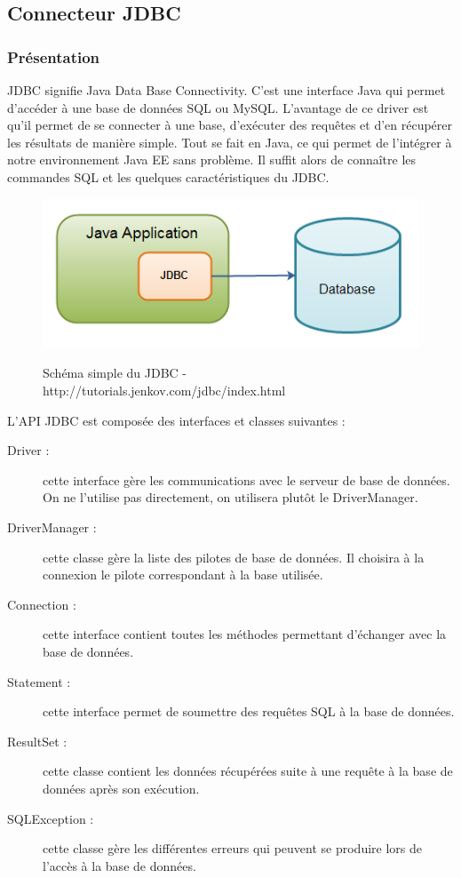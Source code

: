 \subsection{Connecteur JDBC}

\subsubsection{Présentation}
JDBC signifie Java Data Base Connectivity. C'est une interface Java qui permet d'accéder à une base de données SQL ou MySQL. L'avantage de ce driver est qu'il permet de se connecter à une base, d'exécuter des requêtes et d'en récupérer les résultats de manière simple. Tout se fait en Java, ce qui permet de l'intégrer à notre environnement Java EE sans problème. Il suffit alors de connaître les commandes SQL et les quelques caractéristiques du JDBC.\\

\begin{figure}[!h]
  \center
  \includegraphics[scale=0.7]{../graph/jdbc.png} \\
  \caption{Schéma simple du JDBC - http://tutorials.jenkov.com/jdbc/index.html}
\end{figure}

L'API JDBC est composée des interfaces et classes suivantes :
\begin{description}
 \item[Driver :] cette interface gère les communications avec le serveur de base de données. On ne l'utilise pas directement, on utilisera plutôt le DriverManager.
 \item[DriverManager :] cette classe gère la liste des pilotes de base de données. Il choisira à la connexion le pilote correspondant à la base utilisée.
 \item[Connection :] cette interface contient toutes les méthodes permettant d'échanger avec la base de données.
 \item[Statement :] cette interface permet de soumettre des requêtes SQL à la base de données.
 \item[ResultSet :] cette classe contient les données récupérées suite à une requête à la base de données après son exécution.
 \item[SQLException :] cette classe gère les différentes erreurs qui peuvent se produire lors de l'accès à la base de données. 
\end{description}

